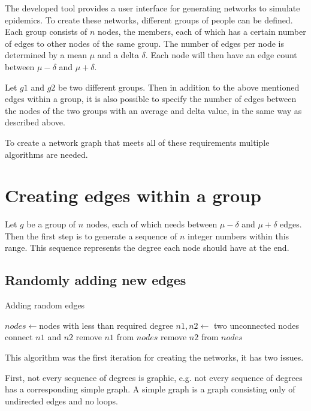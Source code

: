 The developed tool provides a user interface for generating networks to simulate epidemics. To create these networks, different groups of people can be defined. Each group consists of $n$ nodes, the members, each of which has a certain number of edges to other nodes of the same group. The number of edges per node is determined by a mean $\mu$ and a delta $\delta$. Each node will then have an edge count between $\mu - \delta$ and $\mu + \delta$.

Let $g1$ and $g2$ be two different groups. Then in addition to the above mentioned edges within a group, it is also possible to specify the number of edges between the nodes of the two groups with an average and delta value, in the same way as described above.

To create a network graph that meets all of these requirements multiple algorithms are needed.

\section{Creating edges within a group}
\label{sec:creating_edges_in_group}
Let $g$ be a group of $n$ nodes, each of which needs between $\mu - \delta$ and $\mu + \delta$ edges. Then the first step is to generate a sequence of $n$ integer numbers within this range. This sequence represents the degree each node should have at the end.

\subsection{Randomly adding new edges}
\begin{algorithm}
\caption{Adding random edges}
\label{alg:random_edges}
\begin{algorithmic}
\State $nodes \gets $nodes with less than required degree
    \State $n1, n2 \gets$ two unconnected nodes
    \State connect $n1$ and $n2$
        \State remove $n1$ from $nodes$
    \EndIf
        \State remove $n2$ from $nodes$
    \EndIf
\EndWhile
\end{algorithmic}
\end{algorithm}

This algorithm was the first iteration for creating the networks, it has two issues. 
\newline

First, not every sequence of degrees is graphic, e.g. not every sequence of degrees has a corresponding simple graph. A simple graph is a graph consisting only of undirected edges and no loops.

